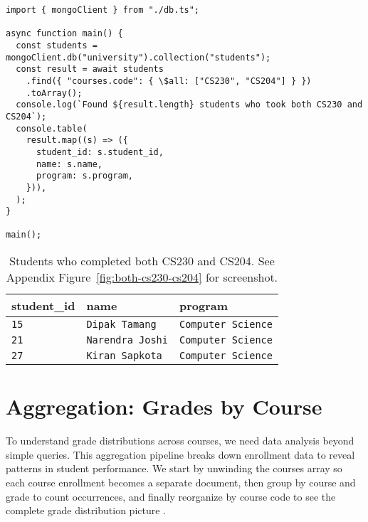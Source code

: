 \begin{verbatim}
import { mongoClient } from "./db.ts";

async function main() {
  const students = mongoClient.db("university").collection("students");
  const result = await students
    .find({ "courses.code": { \$all: ["CS230", "CS204"] } })
    .toArray();
  console.log(`Found ${result.length} students who took both CS230 and CS204`);
  console.table(
    result.map((s) => ({
      student_id: s.student_id,
      name: s.name,
      program: s.program,
    })),
  );
}

main();
\end{verbatim}

\begin{table}[H]
  \centering
  \begin{tabular}{|l|l|l|}
    \hline
    \textbf{student\_id} & \textbf{name} & \textbf{program} \\
    \hline
    \texttt{15} & \texttt{Dipak Tamang} & \texttt{Computer Science} \\
    \texttt{21} & \texttt{Narendra Joshi} & \texttt{Computer Science} \\
    \texttt{27} & \texttt{Kiran Sapkota} & \texttt{Computer Science} \\
    \hline
  \end{tabular}
      \caption{Students who completed both CS230 and CS204. See Appendix Figure~\ref{fig:both-cs230-cs204} for screenshot.}
\end{table}

\section{Aggregation: Grades by Course}
To understand grade distributions across courses, we need data analysis beyond simple queries. This aggregation pipeline breaks down enrollment data to reveal patterns in student performance. We start by unwinding the courses array so each course enrollment becomes a separate document, then group by course and grade to count occurrences, and finally reorganize by course code to see the complete grade distribution picture \parencite{mongodb_architecture}.

